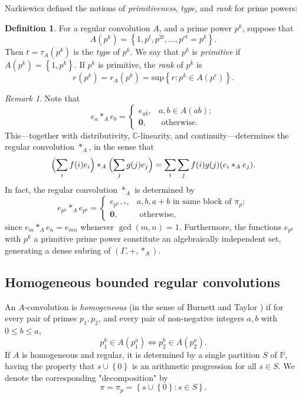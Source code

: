 \documentclass[12pt]{article}
\theoremstyle{definition}
\newtheorem{definition}{Definition}
\theoremstyle{remark}
\newtheorem{remark}{Remark}
\theoremstyle{plain}
\newcommand{\set}[1]{\left\{{#1}\right\}}
\newcommand\setsuchas[2]{\left\{{#1}:{#2}\right\}}
\newcommand{\NNp}{{\mathbb{P}}}
\newcommand{\CC}{{\mathbb{C}}}
\newcommand{\type}{\tau}
\newcommand{\Arank}[1]{r_{#1}}
\begin{document}
Narkiewicz defined the notions of \emph{primitiveness}, \emph{type}, and \emph{rank} for prime powers:
\begin{definition}
For a regular convolution \(A\), and a prime power \(p^{k}\), suppose that
\begin{equation}
\label{eq:org88b7a90}
A(p^{k}) = \set{1,p^{t}, p^{2t}, \dots, p^{rt}=p^{k}}.
\end{equation}
Then \(t = \type_{A}(p^{k})\)  is the \emph{type} of \(p^{k}\).
We say that \(p^{k}\) is \emph{primitive} if \(A(p^{k}) = \set{1,p^{k}}\).
If \(p^{k}\) is primitive, the \emph{rank}  of \(p^{k}\) is
\[
\Arank{}(p^{k}) = \Arank{A}(p^{k})=  \mathrm{sup} \setsuchas{r}{p^{k} \in A(p^{r})}.
\]
\label{org5d74b9d}
\end{definition}

\begin{remark}
Note that
\begin{displaymath}
e_{a} *_{A} e_{b} =
\begin{cases}
  e_{ab}, & a,b \in A(ab); \\
  \mathbf{0}, & \text{ otherwise. }
\end{cases}
\end{displaymath}
This---together with distributivity, \(\CC\)-linearity, and continuity---determines the regular convolution \(*_{A}\), in the sense that
\begin{equation}
\label{eq:org9aee4e2}
  \Bigl(\sum_{i} f(i)e_{i}  \Bigr) *_{A} \Bigl(\sum_{j} g(j)e_{j}  \Bigr) =
  \sum_{i} \sum_{j} f(i)g(j) (e_{i}*_{A} e_{j}).
\end{equation}
In fact, the regular convolution \(*_{A}\) is determined by
\begin{equation}
\label{eq:org3616d57}
e_{p^{a}} *_{A} e_{p^{b}} =
\begin{cases}
  e_{p^{a+b}}, & a,b,a+b \text{ in same block of } \pi_{p}; \\
  \mathbf{0}, & \text{ otherwise, }
\end{cases}
\end{equation}
since \(e_{m} *_{A} e_{n} = e_{mn}\) whenever \(\gcd(m,n)=1\). Furthermore, the functions \(e_{{p^{k}}}\) with \(p^{k}\) a primitive prime power
constitute an algebraically independent set, generating a dense subring of \((\Gamma,+,*_{A})\).
\label{orgb245134}
\end{remark}
\subsection{Homogeneous bounded regular convolutions}
\label{sec:org1d3d116}
An \(A\)-convolution is \emph{homogeneous} (in the sense of Burnett and Taylor \cite{BurnettGeneralAfunctions})
if for every pair of primes \(p_{1},p_{2}\), and every pair of non-negative integers \(a,b\) with \(0 \le b \le a\),
\[p_{1}^{b} \in A(p_{1}^{a}) \iff p_{2}^{b} \in A(p_{2}^{a}).\]
If \(A\) is homogeneous and regular, it is determined by a single partition
\(S\) of \(\NNp\), having the property that \(s \cup \set{0}\) is an arithmetic progression for
all \(s \in S\). We denote the corresponding "decomposition" by
\[\pi = \pi_{p} = \setsuchas{s \cup\set{0}}{s \in S}.\]
\end{document}
